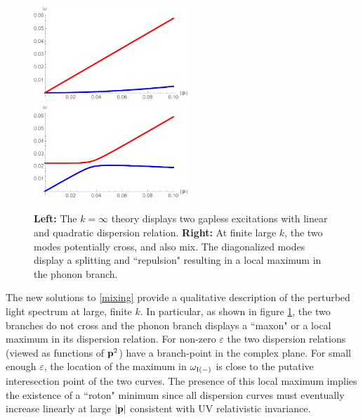 \begin{figure}[h]
\begin{center}
\includegraphics[width=2.3in]{Chapter_3_Folder_1806.06976/figures/crossing0.pdf}\hspace{0.8in}\includegraphics[width=2.3in]{Chapter_3_Folder_1806.06976/figures/crossing.pdf}
\end{center}
    \caption[This figure shows how the inclusion of a Chern-Simons term causes a level-splitting.]{ {\bf Left:} The $k=\infty$ theory displays two gapless excitations with linear and quadratic dispersion relation. {\bf Right:} At finite large $k$, the two modes potentially cross, and also mix. The diagonalized modes display  a splitting and ``repulsion" resulting in a local maximum in the phonon branch.
}\label{cross}
\end{figure}
The new solutions to \eqref{mixing} provide a qualitative description of the perturbed light spectrum at large, finite $k$.  
In particular, as shown in figure \ref{cross}, the two branches do not cross and the phonon branch displays a ``maxon" or a local maximum in its dispersion relation.  
For non-zero $\varepsilon$ the two dispersion relations (viewed as functions of ${\bf p}^2$) have a branch-point in the complex plane. For small enough $\varepsilon$, the location of the maximum in $\omega_{\rm I(-)}$ is close to the putative interesection point of the two curves.
The presence of this local maximum implies the existence of a ``roton" minimum since all dispersion curves must eventually increase linearly at large $|{\bf p}|$ consistent with UV relativistic invariance. 


